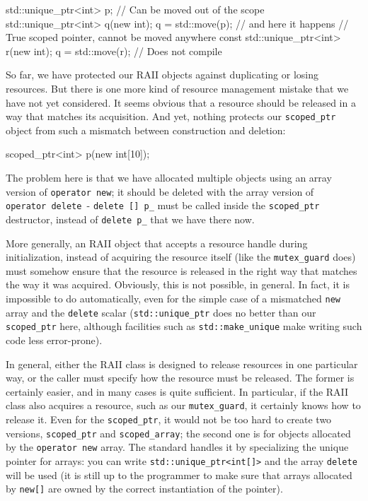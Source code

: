 \begin{code}
std::unique_ptr<int> p;
{
  // Can be moved out of the scope
  std::unique_ptr<int> q(new int);
  q = std::move(p);    // and here it happens
  // True scoped pointer, cannot be moved anywhere
  const std::unique_ptr<int> r(new int);
  q = std::move(r);    // Does not compile
}
\end{code}

So far, we have protected our RAII objects against duplicating or losing resources. But there is one more kind of resource management mistake that we have not yet considered. It seems obvious that a resource should be released in a way that matches its acquisition. And yet, nothing protects our \texttt{scoped\_ptr} object from such a mismatch between construction and deletion:

\begin{code}
scoped_ptr<int> p(new int[10]);
\end{code}

The problem here is that we have allocated multiple objects using an array version of \texttt{operator\ new}; it should be deleted with the array version of \texttt{operator\ delete\ }- \texttt{delete\ {[}{]}\ p\_} must be called inside the \texttt{scoped\_ptr} destructor, instead of \texttt{delete\ p\_} that we have there now.

More generally, an RAII object that accepts a resource handle during initialization, instead of acquiring the resource itself (like the \texttt{mutex\_guard} does) must somehow ensure that the resource is released in the right way that matches the way it was acquired. Obviously, this is not possible, in general. In fact, it is impossible to do automatically, even for the simple case of a mismatched \texttt{new} array and the \texttt{delete} scalar (\texttt{std::unique\_ptr} does no better than our \texttt{scoped\_ptr} here, although facilities such as \texttt{std::make\_unique} make writing such code less error-prone).

In general, either the RAII class is designed to release resources in one particular way, or the caller must specify how the resource must be released. The former is certainly easier, and in many cases is quite sufficient. In particular, if the RAII class also acquires a resource, such as our \texttt{mutex\_guard}, it certainly knows how to release it. Even for the \texttt{scoped\_ptr}, it would not be too hard to create two versions, \texttt{scoped\_ptr} and \texttt{scoped\_array}; the second one is for objects allocated by the \texttt{operator\ new} array. The standard handles it by specializing the unique pointer for arrays: you can write \texttt{std::unique\_ptr\textless{}int{[}{]}\textgreater{}} and the array \texttt{delete} will be used (it is still up to the programmer to make sure that arrays allocated by \texttt{new{[}{]}} are owned by the correct instantiation of the pointer).

